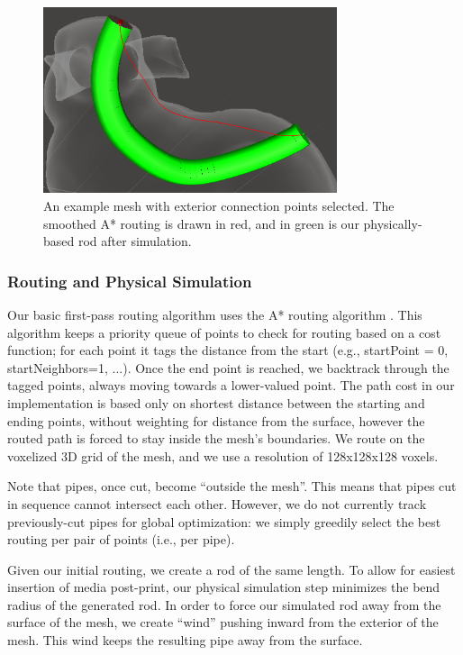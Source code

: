 \begin{figure}[h!]
\centering
    \includegraphics[width=3.4in]{figures/exterior.png}
\caption{An example mesh with exterior connection points selected.  The smoothed A* routing is drawn in {\color{red}red}, and in {\color{tovi}green} is our physically-based rod after simulation. }
\label{fig:tool-process-exterior}
\end{figure}

\subsubsection{Routing and Physical Simulation}

Our basic first-pass routing algorithm uses the A* routing algorithm \cite{Hart-Astar}.  This algorithm keeps a priority queue of points to check for routing based on a cost function; for each point it tags the distance from the start (e.g., startPoint = 0, startNeighbors=1, ...).  Once the end point is reached, we backtrack through the tagged points, always moving towards a lower-valued point.  The path cost in our implementation is based only on shortest distance between the starting and ending points, without weighting for distance from the surface, however the routed path is forced to stay inside the mesh's boundaries.  We route on the voxelized 3D grid of the mesh, and we use a resolution of 128x128x128 voxels. 

Note that pipes, once cut, become ``outside the mesh''.  This means that pipes cut in sequence cannot intersect each other.  However, we do not currently track previously-cut pipes for global optimization: we simply greedily select the best routing per pair of points (i.e., per pipe).

Given our initial routing, we create a rod of the same length.  To allow for easiest insertion of media post-print, our physical simulation step minimizes the bend radius of the generated rod.  In order to force our simulated rod away from the surface of the mesh, we create ``wind'' pushing inward from the exterior of the mesh.  This wind keeps the resulting pipe away from the surface. 

